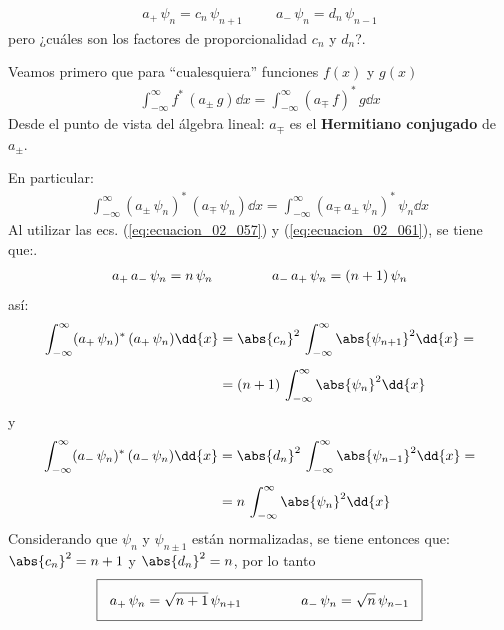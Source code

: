 \begin{align}
a_{+} \, \psi_{n} = c_{n} \, \psi_{n+1} \hspace{1cm} a_{-} \, \psi_{n} = d_{n} \, \psi_{n-1}
\label{eq:ecuacion_02_063}
\end{align}
pero ¿cuáles son los factores de proporcionalidad $c_{n}$ y $d_{n}$?.
\par
Veamos primero que para \enquote{cualesquiera} funciones $f(x)$ y $g(x)$
\begin{align}
\int_{-\infty}^{\infty} f^{*} \, (a_{\pm} \, g) \dd{x} = \int_{-\infty}^{\infty} (a_{\mp} \, f)^{*} \, g \dd{x}
\label{eq:ecuacion_02_064}
\end{align}
Desde el punto de vista del álgebra lineal: $a_{\mp}$ es el \textbf{Hermitiano conjugado} de $a_{\pm}$.
\par
En particular:
\begin{align*}
\int_{-\infty}^{\infty} (a_{\pm} \, \psi_{n})^{*} \, (a_{\mp} \, \psi_{n}) \dd{x} = \int_{-\infty}^{\infty} (a_{\mp} \, a_{\pm} \, \psi_{n})^{*} \, \psi_{n} \dd{x}
\end{align*}
Al utilizar las ecs. (\ref{eq:ecuacion_02_057}) y (\ref{eq:ecuacion_02_061}), se tiene que:.
\begin{align}
a_{+} \, a_{-} \, \psi_{n} = n \, \psi_{n} \hspace{1.5cm} a_{-} \, a_{+} \, \psi_{n} = (n + 1) \, \psi_{n}
\label{eq:ecuacion_02_065}
\end{align}
así:
\begin{align*}
\int_{-\infty}^{\infty} (a_{+} \, \psi_{n})^{*} \, (a_{+} \, \psi_{n}) \dd{x} &= \abs{c_{n}}^{2} \, \int_{-\infty}^{\infty} \abs{\psi_{n+1}}^{2} \dd{x} = \\[0.5em]
&= (n + 1) \, \int_{-\infty}^{\infty} \abs{\psi_{n}}^{2} \dd{x} 
\end{align*}
y
\begin{align*}
\int_{-\infty}^{\infty} (a_{-} \, \psi_{n})^{*} \, (a_{-} \, \psi_{n}) \dd{x} &= \abs{d_{n}}^{2} \, \int_{-\infty}^{\infty} \abs{\psi_{n-1}}^{2} \dd{x} = \\[0.5em]
&= n \, \int_{-\infty}^{\infty} \abs{\psi_{n}}^{2} \dd{x} 
\end{align*}
Considerando que $\psi_{n}$ y $\psi_{n \pm 1}$ están normalizadas, se tiene entonces que: $\abs{c_{n}}^{2} = n + 1$ y $\abs{d_{n}}^{2} = n$, por lo tanto
\begin{align}
\setlength{\fboxsep}{3\fboxsep}\boxed{
a_{+} \, \psi_{n} = \sqrt{n + 1} \, \psi_{n+1} \hspace{1.5cm} a_{-} \, \psi_{n} = \sqrt{n} \, \psi_{n-1}
}
\label{eq:ecuacion_02_066}
\end{align}
